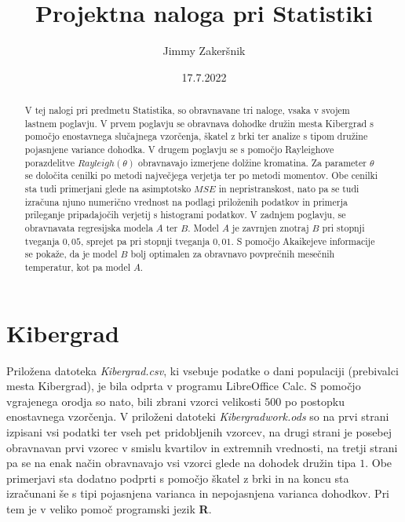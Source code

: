 \documentclass[a4paper, 10pt]{article}
\title{Projektna naloga pri Statistiki}
\date{17.7.2022}
\author{Jimmy Zakeršnik}
\begin{document}
	\maketitle
	\thispagestyle{empty}
	\newpage
	\begin{abstract}
		V tej nalogi pri predmetu Statistika, so obravnavane tri naloge, vsaka v svojem lastnem poglavju. V prvem poglavju se obravnava dohodke družin mesta Kibergrad s pomočjo enostavnega slučajnega vzorčenja, škatel z brki ter analize s tipom družine pojasnjene variance dohodka. V drugem poglavju se s pomočjo Rayleighove porazdelitve $Rayleigh(\theta)$ obravnavajo izmerjene dolžine kromatina. Za parameter $\theta$ se določita cenilki po metodi največjega verjetja ter po metodi momentov. Obe cenilki sta tudi primerjani glede na asimptotsko $MSE$ in nepristranskost, nato pa se tudi izračuna njuno numerično vrednost na podlagi priloženih podatkov in primerja prileganje pripadajočih verjetij s histogrami podatkov. V zadnjem poglavju, se obravnavata regresijska modela $A$ ter $B$. Model $A$ je zavrnjen znotraj $B$ pri stopnji tveganja $0{,}05$, sprejet pa pri stopnji tveganja $0{,}01$. S pomočjo Akaikejeve informacije se pokaže, da je model $B$ bolj optimalen za obravnavo povprečnih mesečnih temperatur, kot pa model $A$.
	\end{abstract}
	\newpage
	\tableofcontents
	\listoffigures
	\listoftables
	\newpage
	\section{Kibergrad}\label{sect: Kibergrad}
	Priložena datoteka \textit{Kibergrad.csv}, ki vsebuje podatke o dani populaciji (prebivalci mesta Kibergrad), je bila odprta v programu LibreOffice Calc. S pomočjo vgrajenega orodja so nato, bili zbrani vzorci velikosti $500$ po postopku enostavnega vzorčenja. V priloženi datoteki \textit{Kibergradwork.ods} so na prvi strani izpisani vsi podatki ter vseh pet pridobljenih vzorcev, na drugi strani je posebej obravnavan prvi vzorec v smislu kvartilov in extremnih vrednosti, na tretji strani pa se na enak način obravnavajo vsi vzorci glede na dohodek družin tipa $1$. Obe primerjavi sta dodatno podprti s pomočjo škatel z brki in na koncu sta izračunani še s tipi pojasnjena varianca in nepojasnjena varianca dohodkov. Pri tem je v veliko pomoč programski jezik \textbf{R}.
	
\end{document}
